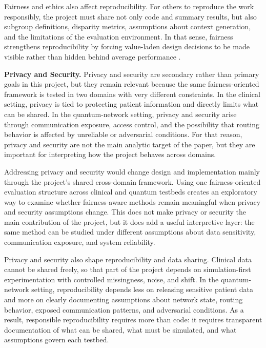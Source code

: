 \documentclass[10pt]{article}
\begin{document}
Fairness and ethics also affect reproducibility. For others to reproduce the work responsibly, the project must share not only code and summary results, but also subgroup definitions, disparity metrics, assumptions about context generation, and the limitations of the evaluation environment. In that sense, fairness strengthens reproducibility by forcing value-laden design decisions to be made visible rather than hidden behind average performance \cite{leslie2023}.

\textbf{Privacy and Security.}
Privacy and security are secondary rather than primary goals in this project, but they remain relevant because the same fairness-oriented framework is tested in two domains with very different constraints. In the clinical setting, privacy is tied to protecting patient information and directly limits what can be shared. In the quantum-network setting, privacy and security arise through communication exposure, access control, and the possibility that routing behavior is affected by unreliable or adversarial conditions. For that reason, privacy and security are not the main analytic target of the paper, but they are important for interpreting how the project behaves across domains.

Addressing privacy and security would change design and implementation mainly through the project's shared cross-domain framework. Using one fairness-oriented evaluation structure across clinical and quantum testbeds creates an exploratory way to examine whether fairness-aware methods remain meaningful when privacy and security assumptions change. This does not make privacy or security the main contribution of the project, but it does add a useful interpretive layer: the same method can be studied under different assumptions about data sensitivity, communication exposure, and system reliability.

Privacy and security also shape reproducibility and data sharing. Clinical data cannot be shared freely, so that part of the project depends on simulation-first experimentation with controlled missingness, noise, and shift. In the quantum-network setting, reproducibility depends less on releasing sensitive patient data and more on clearly documenting assumptions about network state, routing behavior, exposed communication patterns, and adversarial conditions. As a result, responsible reproducibility requires more than code: it requires transparent documentation of what can be shared, what must be simulated, and what assumptions govern each testbed.
\end{document}
